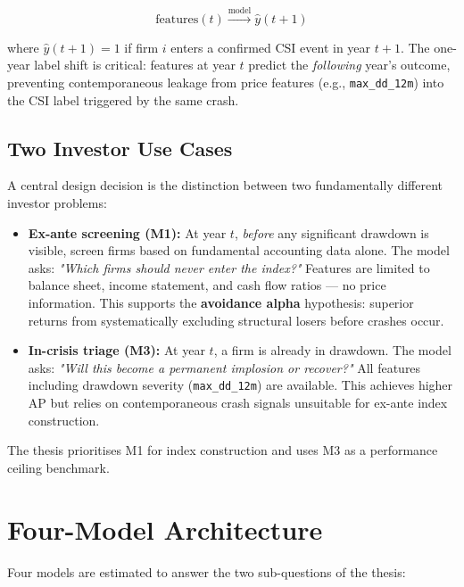 \documentclass{report}\usepackage[]{graphicx}\usepackage[table]{xcolor}
\begin{document}
\begin{equation}
    \text{features}(t) \xrightarrow{\text{model}} \hat{y}(t+1)
\end{equation}

where $\hat{y}(t+1) = 1$ if firm $i$ enters a confirmed CSI event in year $t+1$. 
The one-year label shift is critical: features at year $t$ predict the \textit{following} 
year's outcome, preventing contemporaneous leakage from price features 
(e.g., \texttt{max\_dd\_12m}) into the CSI label triggered by the same crash.

\subsection{Two Investor Use Cases}

A central design decision is the distinction between two fundamentally different investor problems:

\begin{itemize}
    \item \textbf{Ex-ante screening (M1):} At year $t$, \textit{before} any significant drawdown 
    is visible, screen firms based on fundamental accounting data alone. The model asks: 
    \textit{"Which firms should never enter the index?"} Features are limited to balance sheet, 
    income statement, and cash flow ratios — no price information. This supports the 
    \textbf{avoidance alpha} hypothesis: superior returns from systematically excluding 
    structural losers before crashes occur.

    \item \textbf{In-crisis triage (M3):} At year $t$, a firm is already in drawdown. 
    The model asks: \textit{"Will this become a permanent implosion or recover?"} 
    All features including drawdown severity (\texttt{max\_dd\_12m}) are available. 
    This achieves higher AP but relies on contemporaneous crash signals unsuitable 
    for ex-ante index construction.
\end{itemize}

The thesis prioritises M1 for index construction and uses M3 as a performance ceiling benchmark.

\section{Four-Model Architecture}

Four models are estimated to answer the two sub-questions of the thesis:
\end{document}
